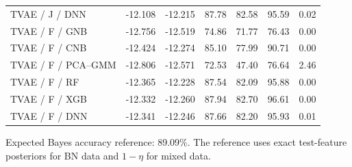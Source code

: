 \documentclass[11pt,letterpaper]{article}
\begin{document}
\begin{table}[H]
\begin{tabular}{lrrrrrr}
TVAE / J / DNN & -12.108 & -12.215 & 87.78 & 82.58 & 95.59 & 0.02\\
TVAE / F / GNB & -12.756 & -12.519 & 74.86 & 71.77 & 76.43 & 0.00\\
TVAE / F / CNB & -12.424 & -12.274 & 85.10 & 77.99 & 90.71 & 0.00\\
TVAE / F / PCA--GMM & -12.806 & -12.571 & 72.53 & 47.40 & 76.64 & 2.46\\
TVAE / F / RF & -12.365 & -12.228 & 87.54 & 82.09 & 95.88 & 0.00\\
TVAE / F / XGB & -12.332 & -12.260 & 87.94 & 82.70 & 96.61 & 0.00\\
TVAE / F / DNN & -12.341 & -12.246 & 87.66 & 82.20 & 95.93 & 0.01\\
\bottomrule\end{tabular}
\end{table}
Expected Bayes accuracy reference: 89.09\%. The reference uses exact test-feature posteriors for BN data and $1-\eta$ for mixed data.
\clearpage
\end{document}
